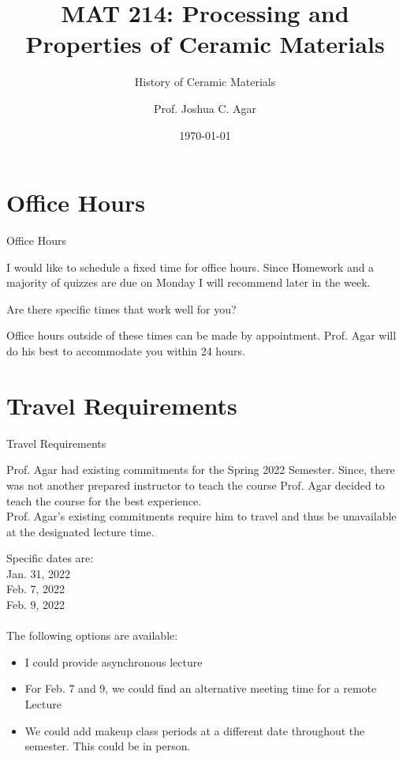 \documentclass{libs/XJTLU_format}
\title[MAT 214 Spring 2022]{\textbf{MAT 214: Processing and Properties of Ceramic Materials}}
\subtitle{History of Ceramic Materials}
\author{Prof. Joshua C. Agar}
\institute[Lehigh University]{
    \normalsize{\email{jca318@lehigh.edu}}
    \newline
    \department{Materials Science and Engineering}
    \newline
    \university{Lehigh Univeristy}
}
\date{\today}
\begin{document}


\begin{frame}{}
    \maketitle
\end{frame}

\section{Office Hours}
\begin{frame}{Office Hours}

I would like to schedule a fixed time for office hours. Since Homework and a majority of quizzes are due on Monday I will recommend later in the week. \\[0.3cm] \pause

Are there specific times that work well for you?\\[0.3cm] \pause

Office hours outside of these times can be made by appointment. Prof. Agar will do his best to accommodate you within 24 hours.
    
\end{frame}

\section{Travel Requirements}
\begin{frame}{Travel Requirements}

Prof. Agar had existing commitments for the Spring 2022 Semester. Since, there was not another prepared instructor to teach the course Prof. Agar decided to teach the course for the best experience. \\[0.3cm]

Prof. Agar's existing commitments require him to travel and thus be unavailable at the designated lecture time.\\[0.3cm]
\pause

Specific dates are:\\
Jan. 31, 2022 \\
Feb. 7, 2022\\
Feb. 9, 2022\\
\\[0.3cm]

\pause
The following options are available:
\begin{itemize}
    \item I could provide asynchronous lecture
    \item For Feb. 7 and 9, we could find an alternative meeting time for a remote Lecture
    \item We could add makeup class periods at a different date throughout the semester. This could be in person. 
\end{itemize}

\end{frame}
\end{document}
